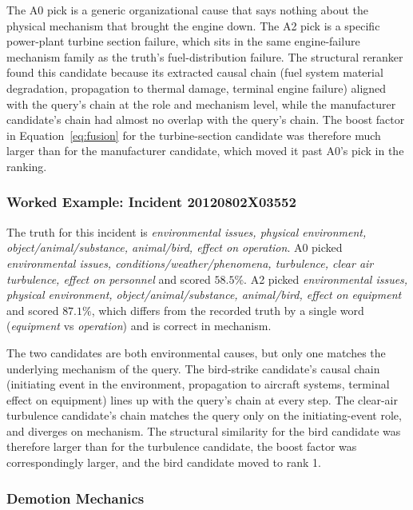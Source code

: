 \documentclass[11pt]{article}
\begin{document}
The A0 pick is a generic organizational cause that says nothing about the physical mechanism that brought the engine down. The A2 pick is a specific power-plant turbine section failure, which sits in the same engine-failure mechanism family as the truth's fuel-distribution failure. The structural reranker found this candidate because its extracted causal chain (fuel system material degradation, propagation to thermal damage, terminal engine failure) aligned with the query's chain at the role and mechanism level, while the manufacturer candidate's chain had almost no overlap with the query's chain. The boost factor in Equation~\ref{eq:fusion} for the turbine-section candidate was therefore much larger than for the manufacturer candidate, which moved it past A0's pick in the ranking.

\subsubsection{Worked Example: Incident 20120802X03552}
\label{sec:verify_phase3:wins:bird}

The truth for this incident is \emph{environmental issues, physical environment, object/animal/substance, animal/bird, effect on operation}. A0 picked \emph{environmental issues, conditions/weather/phenomena, turbulence, clear air turbulence, effect on personnel} and scored $58.5\%$. A2 picked \emph{environmental issues, physical environment, object/animal/substance, animal/bird, effect on equipment} and scored $87.1\%$, which differs from the recorded truth by a single word (\emph{equipment} vs \emph{operation}) and is correct in mechanism.

The two candidates are both environmental causes, but only one matches the underlying mechanism of the query. The bird-strike candidate's causal chain (initiating event in the environment, propagation to aircraft systems, terminal effect on equipment) lines up with the query's chain at every step. The clear-air turbulence candidate's chain matches the query only on the initiating-event role, and diverges on mechanism. The structural similarity for the bird candidate was therefore larger than for the turbulence candidate, the boost factor was correspondingly larger, and the bird candidate moved to rank 1.

\subsubsection{Demotion Mechanics}
\label{sec:verify_phase3:wins:demotion}
\end{document}
